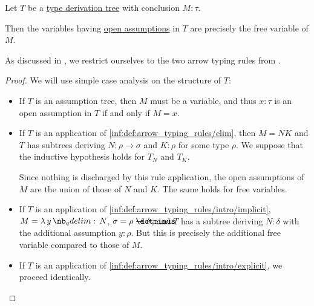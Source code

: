 \begin{proposition}\label{thm:assumptions_and_free_variables}
  Let \( T \) be a \hyperref[def:type_derivation_tree]{type derivation tree} with conclusion \( M: \tau \).

  Then the variables having \hyperref[def:type_derivation_tree/context]{open assumptions} in \( T \) are precisely the free variable of \( M \).
\end{proposition}
\begin{comments}
  \item As discussed in , we restrict ourselves to the two arrow typing rules from .
\end{comments}
\begin{proof}
  We will use simple case analysis on the structure of \( T \):
  \begin{itemize}
    \item If \( T \) is an assumption tree, then \( M \) must be a variable, and thus \( x: \tau \) is an open assumption in \( T \) if and only if \( M = x \).

    \item If \( T \) is an application of \ref{inf:def:arrow_typing_rules/elim}, then \( M = NK \) and \( T \) has subtrees deriving \( N: \rho \to \sigma \) and \( K: \rho \) for some type \( \rho \). We suppose that the inductive hypothesis holds for \( T_N \) and \( T_K \).

    Since nothing is discharged by this rule application, the open assumptions of \( M \) are the union of those of \( N \) and \( K \). The same holds for free variables.

    \item If \( T \) is an application of \ref{inf:def:arrow_typing_rules/intro/implicit}, \( M = \qabs y N \), \( \sigma = \rho \synimplies \delta \), and \( T \) has a subtree deriving \( N: \delta \) with the additional assumption \( y: \rho \). But this is precisely the additional free variable compared to those of \( M \).

    \item If \( T \) is an application of \ref{inf:def:arrow_typing_rules/intro/explicit}, we proceed identically.
  \end{itemize}
\end{proof}

